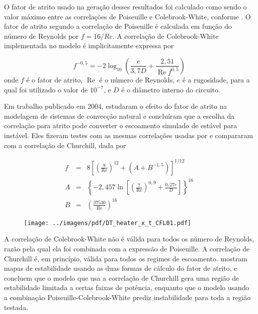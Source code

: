 \documentclass[a4paper,portuguese,10pt]{article}
\renewcommand{\Re}{\operatorname{Re}}
\begin{document}
O fator de atrito usado na geração desses resultados foi calculado como sendo o valor máximo entre as correlações de Poiseuille e Colebrook-White, conforme \citet{VIJAYAN95}. O fator de atrito segundo a correlação de Poiseuille é calculada em função do número de Reynolds por $f=16/Re$. A correlação de Colebrook-White implementada no modelo é implicitamente expressa por

\begin{equation}
  f^{-0,5} = -2\log_{10}\left(\frac{e}{3,7D} + \frac{2,51}{\Re f^{0,5}}\right)
\end{equation}
onde $f$ é o fator de atrito, $\Re$ é o número de Reynolds, $e$ é a rugosidade, para a qual foi utilizado o valor de $10^{-7}$, e $D$ é o diâmetro interno do circuito.

Em trabalho publicado em 2004, \citet{AMBROSINI04} estudaram o efeito do fator de atrito na modelagem de sistemas de convecção natural e concluíram que a escolha da correlação para atrito pode converter o escoamento simulado de estável para instável. Eles fizeram testes com as mesmas correlações usadas por \citet{VIJAYAN95} e compararam com a correlação de Churchill, dada por

\begin{eqnarray}
  f &=& 8\left[\left(\frac{8}{\Re}\right)^{12} + (A+B^{-1,5})\right]^{1/12}\\
  A &=& \left\{-2,457\ln\left[\left(\frac{7}{\Re}\right)^{0,9} + \frac{0,27e}{D}\right]\right\}^{16}\nonumber\\
  B &=& \left(\frac{37530}{\Re}\right)^{16}\nonumber
  \label{eq_churchill}
\end{eqnarray}

\begin{figure}
  \begin{center}
    \texttt{[image: ../imagens/pdf/DT\_heater\_x\_t\_CFL01.pdf]}
    \vspace*{-15mm}
    \label{fig_validacao_trans_03}
  \end{center}
\end{figure}

A correlação de Colebrook-White não é válida para todos os número de Reynolds, razão pela qual ela foi combinada com a expressão de Poiseuille. A correlação de Churchill é, em princípio, válida para todos os regimes de escoamento. \citet{AMBROSINI04} mostram mapas de estabilidade usando as duas formas de cálculo do fator de atrito, e concluem que o modelo que usa a correlação de Churchill gera uma região de estabilidade limitada a certas faixas de potência, enquanto que o modelo usando a combinação Poiseuille-Colebrook-White prediz instabilidade para toda a região testada.
\end{document}
